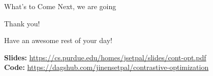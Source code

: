 \documentclass{beamer}
\begin{document}
\begin{frame}{What's to Come}
	Next, we are going 
\end{frame}

\begin{frame}{Thank you!}
	\begin{center}
		Have an awesome rest of your day!
	\end{center}
	\begin{center}
		\small
		\textbf{Slides:} \url{https://cs.purdue.edu/homes/jsetpal/slides/cont-opt.pdf} \\
		\textbf{Code:} \url{https://dagshub.com/jinensetpal/contrastive-optimization}
	\end{center}
\end{frame}
\end{document}
